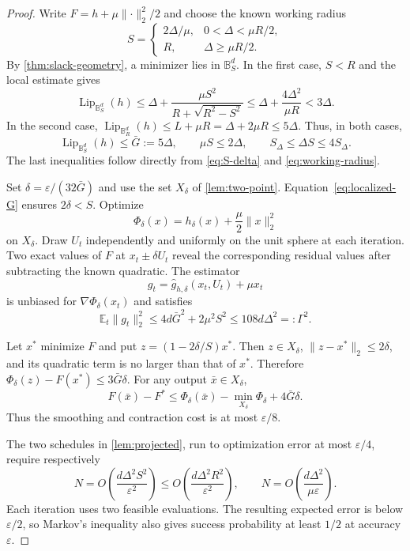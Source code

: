 \documentclass[11pt]{article}
\newcommand{\E}{\mathbb{E}}
\newcommand{\B}{\mathbb{B}}
\newcommand{\eps}{\varepsilon}
\newcommand{\norm}[1]{\lVert #1\rVert_2}
\newcommand{\Lip}{\operatorname{Lip}}
\theoremstyle{plain}
\theoremstyle{definition}
\begin{document}
\begin{proof}
Write $F=h+\mu\norm{\cdot}^2/2$ and choose the known working radius
\begin{equation}\label{eq:working-radius}
 S=\begin{cases}
      2\Delta/\mu,&0<\Delta<\mu R/2,\\
      R,&\Delta\ge\mu R/2.
    \end{cases}
\end{equation}
By \cref{thm:slack-geometry}, a minimizer lies in $\B_S^d$.
In the first case, $S<R$ and the local estimate gives
\[
 \Lip_{\B_S^d}(h)
 \le\Delta+\frac{\mu S^2}{R+\sqrt{R^2-S^2}}
 \le\Delta+\frac{4\Delta^2}{\mu R}<3\Delta.
\]
In the second case,
$\Lip_{\B_R^d}(h)\le L+\mu R=\Delta+2\mu R\le5\Delta$.
Thus, in both cases,
\begin{equation}\label{eq:localized-G}
 \Lip_{\B_S^d}(h)\le\bar G:=5\Delta,
 \qquad \mu S\le2\Delta,
 \qquad S_\Delta\le\Delta S\le4S_\Delta.
\end{equation}
The last inequalities follow directly from \eqref{eq:S-delta} and
\eqref{eq:working-radius}.

Set $\delta=\eps/(32\bar G)$ and use the set $X_\delta$ of
\cref{lem:two-point}. Equation~\eqref{eq:localized-G} ensures
$2\delta<S$. Optimize
\[
 \Phi_\delta(x)=h_\delta(x)+\frac{\mu}{2}\norm{x}^2
\]
on $X_\delta$. Draw $U_t$ independently and uniformly on the unit
sphere at each iteration. Two exact values of $F$ at $x_t\pm\delta U_t$ reveal
the corresponding residual values after subtracting the known
quadratic. The estimator
\[
 g_t=\widehat g_{h,\delta}(x_t,U_t)+\mu x_t
\]
is unbiased for $\nabla\Phi_\delta(x_t)$ and satisfies
\begin{equation}\label{eq:gradient-moment}
 \E_t\norm{g_t}^2
 \le4d\bar G^2+2\mu^2S^2\le108d\Delta^2=:\Gamma^2.
\end{equation}

Let $x^*$ minimize $F$ and put $z=(1-2\delta/S)x^*$.
Then $z\in X_\delta$, $\norm{z-x^*}\le2\delta$, and its quadratic
term is no larger than that of $x^*$. Therefore
$\Phi_\delta(z)-F(x^*)\le3\bar G\delta$.
For any output $\bar x\in X_\delta$,
\begin{equation}\label{eq:smoothing-total}
 F(\bar x)-F^*
 \le\Phi_\delta(\bar x)-\min_{X_\delta}\Phi_\delta
       +4\bar G\delta.
\end{equation}
Thus the smoothing and contraction cost is at most $\eps/8$.

The two schedules in \cref{lem:projected}, run to optimization
error at most $\eps/4$, require respectively
\[
 N=O\left(\frac{d\Delta^2S^2}{\eps^2}\right)
   \le O\left(\frac{d\Delta^2R^2}{\eps^2}\right),
 \qquad
 N=O\left(\frac{d\Delta^2}{\mu\eps}\right).
\]
Each iteration uses two feasible evaluations. The resulting expected
error is below $\eps/2$, so Markov's inequality also gives success
probability at least $1/2$ at accuracy $\eps$.


\end{proof}
\end{document}
